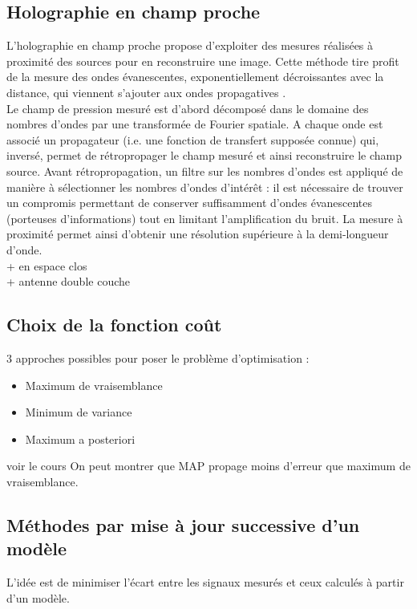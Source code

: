 \subsection{Holographie en champ proche}
L'holographie en champ proche propose d'exploiter des mesures réalisées à proximité des sources pour en reconstruire une image. Cette méthode tire profit de la mesure des ondes évanescentes, exponentiellement décroissantes avec la distance, qui viennent s'ajouter aux ondes propagatives \cite{Maynard1985}.\\
Le champ de pression mesuré est d'abord décomposé dans le domaine des nombres d'ondes par une transformée de Fourier spatiale. A chaque onde est associé un propagateur (i.e. une fonction de transfert supposée connue) qui, inversé, permet de rétropropager le champ mesuré et ainsi reconstruire le champ source.  Avant rétropropagation, un filtre sur les nombres d'ondes est appliqué de manière à sélectionner les nombres d'ondes d'intérêt : il est nécessaire de trouver un compromis permettant de conserver suffisamment d'ondes évanescentes (porteuses d'informations) tout en limitant l'amplification du bruit. La mesure à proximité permet ainsi d'obtenir une résolution supérieure à la demi-longueur d'onde.\\


+ en espace clos\\

+ antenne double couche

\subsection{Choix de la fonction coût}

3 approches possibles pour poser le problème d'optimisation  : 
\begin{itemize}
	\item Maximum de vraisemblance\\
	\item Minimum de variance\\
	\item Maximum a posteriori\\
\end{itemize}
voir le cours %
On peut montrer que MAP propage moins d'erreur que maximum de vraisemblance.

\subsection{Méthodes par mise à jour successive d'un modèle}
L'idée est de minimiser l'écart entre les signaux mesurés et ceux calculés à partir d'un modèle.

